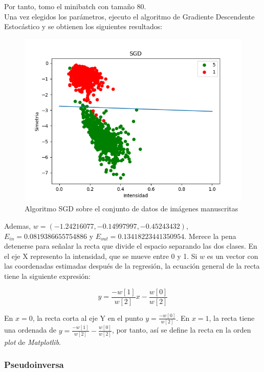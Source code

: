 Por tanto, tomo el minibatch con tamaño 80.\\

Una vez elegidos los parámetros, ejecuto el algoritmo de Gradiente Descendente Estocástico y se obtienen los siguientes resultados:

\begin{figure}[H] %
	\centering
	\includegraphics[scale=0.6]{sgd.png}  %
	\caption{Algoritmo SGD sobre el conjunto de datos de imágenes manuscritas} 
	\label{fig:sgd}
\end{figure}

Ademas, $w=(-1.24216077,-0.14997997,-0.45243432)$, $E_{in} = 0.0819386655754886$ y $E_{out} = 0.13418223441350954$.
Merece la pena detenerse para señalar la recta que divide el espacio separando las dos clases. En el eje X represento la intensidad, que se mueve entre 0 y 1. Si $w$ es un vector con las coordenadas estimadas después de la regresión, la ecuación general de la recta tiene la siguiente expresión:

$$y = \frac{-w[1]}{w[2]}x - \frac{w[0]}{w[2]}$$

En $x=0$, la recta corta al eje Y en el punto $y = \frac{-w[0]}{w[2]}$. En $x=1$, la recta tiene una ordenada de $y=\frac{-w[1]}{w[2]}- \frac{w[0]}{w[2]}$, por tanto, así se define la recta en la orden \textit{plot} de \textit{Matplotlib}.

\subsubsection{Pseudoinversa}

